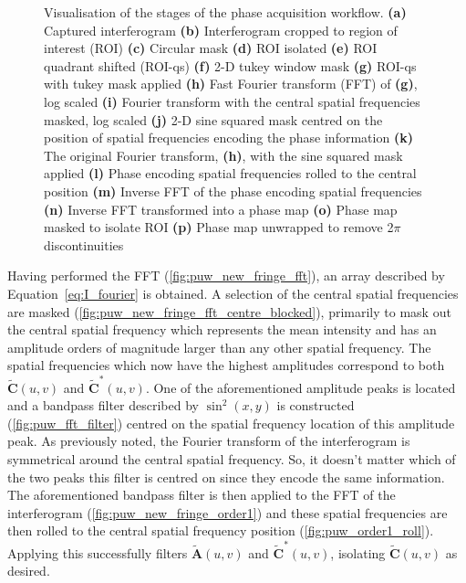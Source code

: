 \begin{figure}
\begin{subfigure}{0.23\textwidth}
		\caption{}
		\label{fig:puw_unwrapped_phase}
	\end{subfigure}
	\caption[Visualisation of the stages of the phase acquisition workflow.]{Visualisation of the stages of the phase acquisition workflow. \textbf{(a)} Captured interferogram \textbf{(b)} Interferogram cropped to region of interest (ROI) \textbf{(c)} Circular mask \textbf{(d)} ROI isolated \textbf{(e)} ROI quadrant shifted (ROI-qs) \textbf{(f)} 2-D tukey window mask \textbf{(g)} ROI-qs with tukey mask applied \textbf{(h)} Fast Fourier transform (FFT) of \textbf{(g)}, log scaled \textbf{(i)} Fourier transform with the central spatial frequencies masked, log scaled \textbf{(j)} 2-D sine squared mask centred on the position of spatial frequencies encoding the phase information \textbf{(k)} The original Fourier transform, \textbf{(h)}, with the sine squared mask applied \textbf{(l)} Phase encoding spatial frequencies rolled to the central position \textbf{(m)} Inverse FFT of the phase encoding spatial frequencies \textbf{(n)} Inverse FFT transformed into a phase map \textbf{(o)} Phase map masked to isolate ROI \textbf{(p)} Phase map unwrapped to remove 2$\pi$ discontinuities}
	\label{fig:phase_unwrap_workflow}
\end{figure}

Having performed the FFT (\ref{fig:puw_new_fringe_fft}), an array described by Equation~\ref{eq:I_fourier} is obtained. A selection of the central spatial frequencies are masked (\ref{fig:puw_new_fringe_fft_centre_blocked}), primarily to mask out the central spatial frequency which represents the mean intensity and has an amplitude orders of magnitude larger than any other spatial frequency. The spatial frequencies which now have the highest amplitudes correspond to both $\tilde{\boldsymbol{C}}(u,v)$ and $\tilde{\boldsymbol{C}}^{*}(u,v)$. One of the aforementioned amplitude peaks is located and a bandpass filter described by $\sin^{2}(x,y)$ is constructed (\ref{fig:puw_fft_filter}) centred on the spatial frequency location of this amplitude peak. As previously noted, the Fourier transform of the interferogram is symmetrical around the central spatial frequency. So, it doesn't matter which of the two peaks this filter is centred on since they encode the same information. The aforementioned bandpass filter is then applied to the FFT of the interferogram (\ref{fig:puw_new_fringe_order1}) and these spatial frequencies are then rolled to the central spatial frequency position (\ref{fig:puw_order1_roll}). Applying this successfully filters $\tilde{\boldsymbol{A}}(u,v)$ and $\tilde{\boldsymbol{C}}^{*}(u,v)$, isolating $\tilde{\boldsymbol{C}}(u,v)$ as desired.


